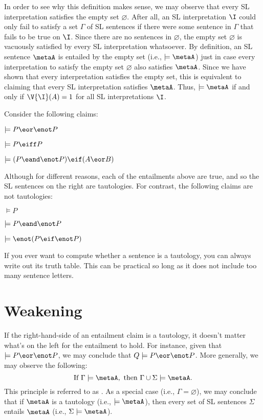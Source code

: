 In order to see why this definition makes sense, we may observe that every SL interpretation satisfies the empty set $\varnothing$.
After all, an SL interpretation $\I$ could only fail to satisfy a set $\Gamma$ of SL sentences if there were some sentence in $\Gamma$ that fails to be true on $\I$.
Since there are no sentences in $\varnothing$, the empty set $\varnothing$ is vacuously satisfied by every SL interpretation whatsoever.
By definition, an SL sentence $\metaA$ is entailed by the empty set (i.e., $\models \metaA$) just in case every interpretation to satisfy the empty set $\varnothing$ also satisfies $\metaA$.
Since we have shown that every interpretation satisfies the empty set, this is equivalent to claiming that every SL interpretation satisfies $\metaA$. 
Thus, $\models \metaA$ if and only if $\V{\I}(A)=1$ for all SL interpretations $\I$.   

Consider the following claims:

\begin{earg}
  \item[] $\models P \eor \enot P$
  \item[] $\models P \eiff P$
  \item[] $\models (P \eand\enot P)\eif (A \eor B)$
\end{earg}

Although for different reasons, each of the entailments above are true, and so the SL sentences on the right are tautologies.
For contrast, the following claims are not tautologies:

\begin{earg}
  \item[] $\models P$
  \item[] $\models P \eand \enot P$
  \item[] $\models \enot(P \eif \enot P)$
\end{earg}

If you ever want to compute whether a sentence is a tautology, you can always write out its truth table.
This can be practical so long as it does not include too many sentence letters.


\section{Weakening}

If the right-hand-side of an entailment claim is a tautology, it doesn't matter what's on the left for the entailment to hold.
For instance, given that $\models P \eor \enot P$, we may conclude that $Q \models P \eor \enot P$.
More generally, we may observe the following:
$$\text{If}~ \Gamma \models \metaA, ~\text{then}~ \Gamma \cup \Sigma\models \metaA.$$
This principle is referred to as .
As a special case (i.e., $\Gamma=\varnothing$), we may conclude that if $\metaA$ is a tautology (i.e., $\models \metaA$), then every set of SL sentences $\Sigma$ entails $\metaA$ (i.e., $\Sigma \models \metaA$).

